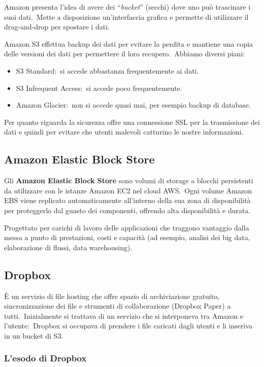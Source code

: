 Amazon presenta l'idea di avere dei ``\textit{bucket}'' (secchi) dove uno può trascinare i suoi dati.\
Mette a disposizione un'interfaccia grafica e permette di utilizzare il drag-and-drop per spostare i dati.\

Amazon S3 effettua backup dei dati per evitare la perdita e mantiene una copia delle versioni dei dati per permettere il loro recupero.\
Abbiamo diversi piani:
\begin{itemize}
    \item S3 Standard:\ si accede abbastanza frequentemente ai dati.
    \item S3 Infrequent Access:\ si accede poco frequentemente.
    \item Amazon Glacier:\ non si accede quasi mai, per esempio backup di database.
\end{itemize}
Per quanto riguarda la sicurezza offre una connessione SSL per la trasmissione dei dati e quindi per evitare che utenti malevoli catturino le nostre informazioni.

\subsection{Amazon Elastic Block Store}
Gli \textbf{Amazon Elastic Block Store} sono volumi di storage a blocchi persistenti da utilizzare con le istanze Amazon EC2 nel cloud AWS.\
Ogni volume Amazon EBS viene replicato automaticamente all'interno della sua zona di disponibilità per proteggerlo dal guasto dei componenti, offrendo alta disponibilità e durata.\

Progettato per carichi di lavoro delle applicazioni che traggono vantaggio dalla messa a punto di prestazioni, costi e capacità (ad esempio, analisi dei big data, elaborazione di flussi, data warehousing).\

\subsection{Dropbox}
È un servizio di file hosting che offre spazio di archiviazione gratuito, sincronizzazione dei file e strumenti di collaborazione (Dropbox Paper) a tutti.\
Inizialmente si trattava di un servizio che si interponeva tra Amazon e l'utente:\ Dropbox si occupava di prendere i file caricati dagli utenti e li inseriva in un bucket di S3.\

\subsubsection{L'esodo di Dropbox}

